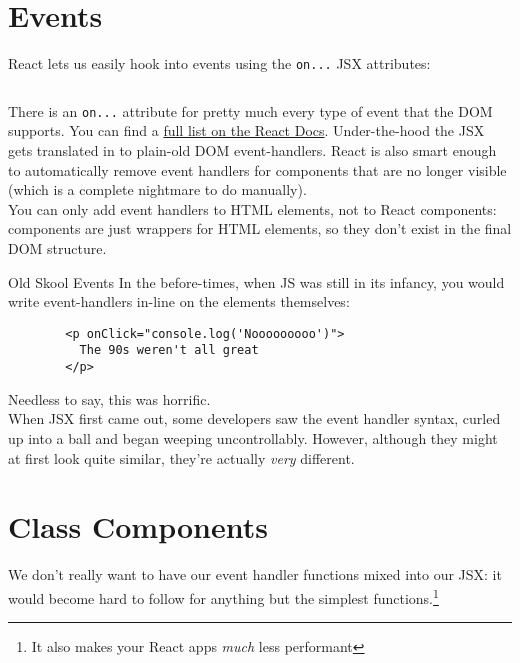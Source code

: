 \section{Events}

React lets us easily hook into events using the \texttt{on...} JSX attributes:

\inputminted{jsx}{04-state/figures/01-onClick.jsx}

There is an \texttt{on...} attribute for pretty much every type of event that the DOM supports. You can find a \href{https://facebook.github.io/react/docs/events.html#supported-events}{full list on the React Docs}. Under-the-hood the JSX gets translated in to plain-old DOM event-handlers. React is also smart enough to automatically remove event handlers for components that are no longer visible (which is a complete nightmare to do manually).
\\

You can only add event handlers to HTML elements, not to React components: components are just wrappers for HTML elements, so they don't exist in the final DOM structure.

\begin{infobox}{Old Skool Events}
    In the before-times, when JS was still in its infancy, you would write event-handlers in-line on the elements themselves:

    \begin{verbatim}
        <p onClick="console.log('Nooooooooo')">
          The 90s weren't all great
        </p>
    \end{verbatim}

    Needless to say, this was horrific.
    \\

    When JSX first came out, some developers saw the event handler syntax, curled up into a ball and  began weeping uncontrollably. However, although they might at first look quite similar, they're actually \textit{very} different.
\end{infobox}



\section{Class Components}

We don't really want to have our event handler functions mixed into our JSX: it would become hard to follow for anything but the simplest functions.\footnote{It also makes your React apps \textit{much} less performant}
\\

